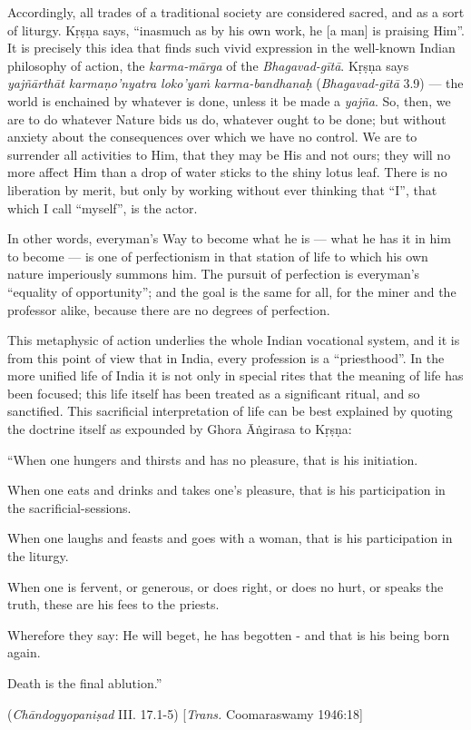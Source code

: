 Accordingly, all trades of a traditional society are considered sacred, and as a sort of liturgy. Kṛṣṇa says, “inasmuch as by his own work, he [a man] is praising Him”. It is precisely this idea that finds such vivid expression in the well-known Indian philosophy of action, the {\sl karma-mārga} of the {\sl Bhagavad-gītā}. Kṛṣṇa says {\sl yajñārthāt karmaṇo’nyatra loko’yaṁ karma-bandhanaḥ} ({\sl Bhagavad-gītā} 3.9) --- the world is enchained by whatever is done, unless it be made a {\sl yajña}. So, then, we are to do whatever Nature bids us do, whatever ought to be done; but without anxiety about the consequences over which we have no control. We are to surrender all activities to Him, that they may be His and not ours; they will no more affect Him than a drop of water sticks to the shiny lotus leaf. There is no liberation by merit, but only by working without ever thinking that “I”, that which I call “myself”, is the actor.

In other words, everyman’s Way to become what he is --- what he has it in him to become --- is one of perfectionism in that station of life to which his own nature imperiously summons him. The pursuit of perfection is everyman’s “equality of opportunity”; and the goal is the same for all, for the miner and the professor alike, because there are no degrees of perfection. 

This metaphysic of action underlies the whole Indian vocational system, and it is from this point of view that in India, every profession is a “priesthood”. In the more unified life of India it is not only in special rites that the meaning of life has been focused; this life itself has been treated as a significant ritual, and so sanctified. This sacrificial interpretation of life can be best explained by quoting the doctrine itself as expounded by Ghora Āṅgirasa to Kṛṣṇa: 
\eject

\begin{myquote}
“When one hungers and thirsts and has no pleasure, that is his initiation. 

When one eats and drinks and takes one’s pleasure, that is his participation in the sacrificial-sessions. 

When one laughs and feasts and goes with a woman, that is his participation in the liturgy. 

When one is fervent, or generous, or does right, or does no hurt, or speaks the truth, these are his fees to the priests. 

Wherefore they say: He will beget, he has begotten - and that is his being born again. 

Death is the final ablution.” 

\hfill({\sl Chāndogyopaniṣad}
 III. 17.1-5) [{\sl Trans.} Coomaraswamy 1946:18] 
\end{myquote}

